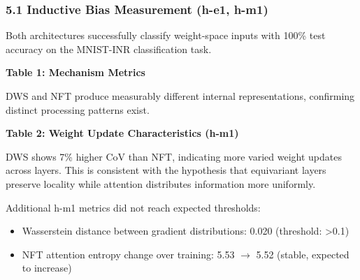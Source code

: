 
\subsubsection{5.1 Inductive Bias Measurement (h-e1, h-m1)}

Both architectures successfully classify weight-space inputs with 100\% test accuracy on the MNIST-INR classification task.

\textbf{Table 1: Mechanism Metrics}

\begin{table}[htbp]
\centering
{}
\end{table}

DWS and NFT produce measurably different internal representations, confirming distinct processing patterns exist.

\textbf{Table 2: Weight Update Characteristics (h-m1)}

\begin{table}[htbp]
\centering
{}
\end{table}

DWS shows 7\% higher CoV than NFT, indicating more varied weight updates across layers. This is consistent with the hypothesis that equivariant layers preserve locality while attention distributes information more uniformly.

Additional h-m1 metrics did not reach expected thresholds:
\begin{itemize}
\item Wasserstein distance between gradient distributions: 0.020 (threshold: >0.1)
\item NFT attention entropy change over training: 5.53 $\rightarrow$ 5.52 (stable, expected to increase)
\end{itemize}

